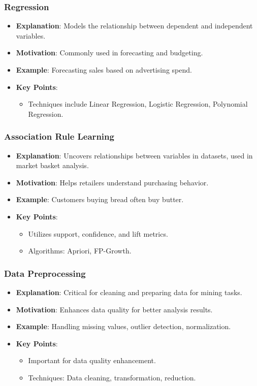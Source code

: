 \documentclass[aspectratio=169]{beamer}
\begin{document}
\begin{frame}[fragile]
    \frametitle{Regression}
    \begin{itemize}
        \item \textbf{Explanation}: Models the relationship between dependent and independent variables.
        \item \textbf{Motivation}: Commonly used in forecasting and budgeting.
        \item \textbf{Example}: Forecasting sales based on advertising spend.
        \item \textbf{Key Points}:
        \begin{itemize}
            \item Techniques include Linear Regression, Logistic Regression, Polynomial Regression.
        \end{itemize}
    \end{itemize}
\end{frame}

\begin{frame}[fragile]
    \frametitle{Association Rule Learning}
    \begin{itemize}
        \item \textbf{Explanation}: Uncovers relationships between variables in datasets, used in market basket analysis.
        \item \textbf{Motivation}: Helps retailers understand purchasing behavior.
        \item \textbf{Example}: Customers buying bread often buy butter.
        \item \textbf{Key Points}:
        \begin{itemize}
            \item Utilizes support, confidence, and lift metrics.
            \item Algorithms: Apriori, FP-Growth.
        \end{itemize}
    \end{itemize}
\end{frame}

\begin{frame}[fragile]
    \frametitle{Data Preprocessing}
    \begin{itemize}
        \item \textbf{Explanation}: Critical for cleaning and preparing data for mining tasks.
        \item \textbf{Motivation}: Enhances data quality for better analysis results.
        \item \textbf{Example}: Handling missing values, outlier detection, normalization.
        \item \textbf{Key Points}:
        \begin{itemize}
            \item Important for data quality enhancement.
            \item Techniques: Data cleaning, transformation, reduction.
        \end{itemize}
    \end{itemize}
\end{frame}
\end{document}
